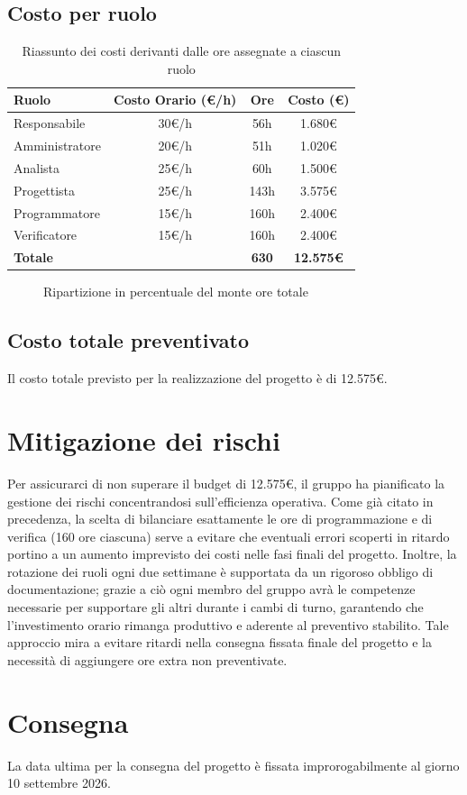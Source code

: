 \documentclass[a4paper,12pt]{article}
\begin{document}
\subsection{Costo per ruolo}
\begin{table}[h!]
\centering
\renewcommand{\arraystretch}{1.5}
\begin{tabular}{|l|c|c|c|}
\hline
\textbf{Ruolo} & \textbf{Costo Orario (€/h)} & \textbf{Ore} & \textbf{Costo (€)} \\
\hline
Responsabile & 30€/h &56h  &1.680€  \\
\hline
Amministratore & 20€/h &51h  &1.020€  \\
\hline
Analista & 25€/h &60h  &1.500€  \\
\hline
Progettista & 25€/h &143h  &3.575€  \\
\hline
Programmatore & 15€/h &160h  &2.400€  \\
\hline
Verificatore & 15€/h &160h  &2.400€  \\
\hline
\textbf{Totale} & & \textbf{630} & \textbf{12.575€} \\
\hline
\end{tabular}
\caption{Riassunto dei costi derivanti dalle ore assegnate a ciascun ruolo}
\label{tab:costi_ruoli}
\end{table}
\begin{figure}[h]
    \centering
    \caption{Ripartizione in percentuale del monte ore totale}
\end{figure}
\subsection{Costo totale preventivato}
Il costo totale previsto per la realizzazione del progetto è di 12.575€.
\newpage
\section{Mitigazione dei rischi}
Per assicurarci di non superare il budget di 12.575€, il gruppo ha pianificato la gestione dei rischi concentrandosi sull'efficienza operativa. Come già citato in precedenza, la scelta di bilanciare esattamente le ore di programmazione e di verifica (160 ore ciascuna) serve a evitare che eventuali errori scoperti in ritardo portino a un aumento imprevisto dei costi nelle fasi finali del progetto.
Inoltre, la rotazione dei ruoli ogni due settimane è supportata da un rigoroso obbligo di documentazione; grazie a ciò ogni membro del gruppo avrà le competenze necessarie per supportare gli altri durante i cambi di turno, garantendo che l'investimento orario rimanga produttivo e aderente al preventivo stabilito. Tale approccio mira a evitare ritardi nella consegna fissata finale del progetto e la necessità di aggiungere ore extra non preventivate.
\section{Consegna}
La data ultima per la consegna del progetto è fissata improrogabilmente al giorno 10 settembre 2026. 
\end{document}
